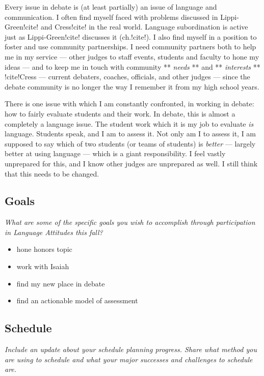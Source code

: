 \documentclass[doc,12pt]{apa6}
\begin{document}
Every issue in debate is (at least partially) an issue of language and
communication. I often find myself faced with problems discussed in
Lippi-Green!cite! and Cress!cite! in the real world. Language
subordination is active just as Lippi-Green!cite! discusses it
(ch.!cite!). I also find myself in a position to foster and use
community partnerships. I need community partners both to help me in my
service --- other judges to staff events, students and faculty to hone
my ideas --- and to keep me in touch with community ** \emph{needs} **
and ** \emph{interests} ** !cite!Cress --- current debaters, coaches,
officials, and other judges --- since the debate community is no longer
the way I remember it from my high school years.

There is one issue with which I am constantly confronted, in working in
debate: how to fairly evaluate students and their work. In debate, this
is almost a completely a language issue. The student work which it is my
job to evaluate \emph{is} language. Students speak, and I am to assess
it. Not only am I to assess it, I am supposed to say which of two
students (or teams of students) is \emph{better} --- largely better at
using language --- which is a giant responsibility. I feel vastly
unprepared for this, and I know other judges are unprepared as well. I
still think that this needs to be changed.

\subsection{Goals}\label{goals}

\emph{What are some of the specific goals you wish to accomplish through
participation in Language Attitudes this fall?}

\begin{itemize}
\itemsep1pt\parskip0pt
\item
  hone honors topic
\item
  work with Isaiah
\item
  find my new place in debate
\item
  find an actionable model of assessment
\end{itemize}

\subsection{Schedule}\label{schedule}

\emph{Include an update about your schedule planning progress. Share
what method you are using to schedule and what your major successes and
challenges to schedule are.}
\end{document}
